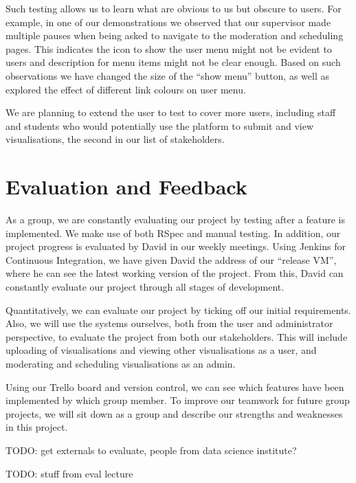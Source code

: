 \documentclass[a4paper]{article}
\begin{document}
Such testing allows us to learn what are obvious to us but obscure to users.
For example, in one of our demonstrations we observed that our supervisor 
made multiple pauses when
being asked to navigate to the moderation and scheduling pages. This 
indicates the icon to show the user menu might not be evident to users and
description for menu items might not be clear enough. Based on such observations
we have changed the size of the ``show menu'' button, as well as explored the effect
of different link colours on user menu.

We are planning to extend the user to test to cover more users, including staff
and students who would potentially use the platform to submit and 
view visualisations, the second in our list of stakeholders.

\section{Evaluation and Feedback}
As a group, we are constantly evaluating our project by testing after a 
feature is implemented. We make use of both RSpec and manual testing. In 
addition, our project progress is evaluated by David in our weekly 
meetings. Using Jenkins for Continuous Integration, we have given David
the address of our ``release VM'', where he can see the latest working 
version of the project. From this, David can constantly evaluate our project 
through all stages of development.

Quantitatively, we can evaluate our project by ticking off our initial 
requirements. Also, we will use the systems ourselves, both from the user 
and administrator perspective, to evaluate the project from both our stakeholders.
This will include uploading of visualisations and viewing other visualisations as a
user, and moderating and scheduling visualisations as an admin.

Using our Trello board and version control, we can see which features have been 
implemented by which group member. To improve our teamwork for future group 
projects, we will sit down as a group and describe our strengths and weaknesses in 
this project.

TODO: get externals to evaluate, people from data science institute? 

TODO: stuff from eval lecture
\end{document}
